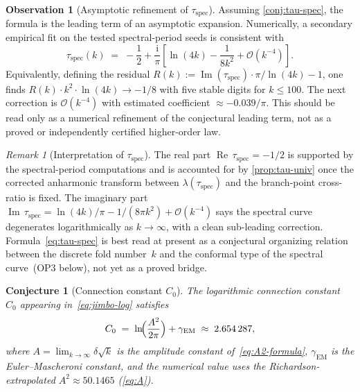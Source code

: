 \documentclass[11pt,a4paper]{article}
\theoremstyle{plain}
\newtheorem{conjecture}[theorem]{Conjecture}
\theoremstyle{definition}
\newtheorem{observation}[theorem]{Observation}
\theoremstyle{remark}
\newtheorem{remark}[theorem]{Remark}
\DeclareMathOperator{\Real}{Re}
\DeclareMathOperator{\Imag}{Im}
\newcommand{\ii}{\mathrm{i}}
\newcommand{\Oo}{\mathcal{O}}
\begin{document}
\begin{observation}[Asymptotic refinement of $\tau_{\mathrm{spec}}$]
\label{cor:tau-refined}
Assuming \cref{conj:tau-spec}, the formula is the leading term of an
asymptotic expansion.  Numerically, a secondary empirical fit on the
tested spectral-period seeds is consistent with
\begin{equation}\label{eq:tau-refined}
  \tau_{\mathrm{spec}}(k)
  \;=\; -\frac{1}{2}
  + \frac{\ii}{\pi}\!\left[
    \ln(4k) - \frac{1}{8k^2} + \Oo(k^{-4})
  \right].
\end{equation}
Equivalently, defining the residual
$R(k) := \Imag(\tau_{\mathrm{spec}})\cdot\pi/\ln(4k) - 1$,
one finds $R(k)\cdot k^2 \cdot \ln(4k) \to -1/8$
with five stable digits for $k \le 100$.
The next correction is $\Oo(k^{-4})$ with estimated
coefficient $\approx -0.039/\pi$.
This should be read only as a numerical refinement of the conjectural
leading term, not as a proved or independently certified higher-order
law.
\end{observation}

\begin{remark}[Interpretation of $\tau_{\mathrm{spec}}$]
\label{rem:tau-spec-meaning}
The real part $\Real\,\tau_{\mathrm{spec}} = -1/2$ is supported by the
spectral-period computations and is accounted for by
\cref{prop:tau-univ} once the corrected anharmonic transform between
$\lambda(\tau_{\mathrm{spec}})$ and the branch-point cross-ratio is fixed.
The imaginary part
$\Imag\,\tau_{\mathrm{spec}} = \ln(4k)/\pi - 1/(8\pi k^2)
+ \Oo(k^{-4})$
says the spectral curve degenerates logarithmically as
$k \to \infty$, with a clean sub-leading correction.
Formula~\eqref{eq:tau-spec} is best read at present as a conjectural
organizing relation between the discrete fold number~$k$ and the
conformal type of the spectral curve~(OP3 below), not yet as a proved
bridge.
\end{remark}

\begin{conjecture}[Connection constant $C_0$]
\label{conj:C0}
The logarithmic connection constant~$C_0$ appearing
in~\eqref{eq:jimbo-log} satisfies
\begin{equation}\label{eq:C0-conj}
  C_0 \;=\; \ln\!\Bigl(\frac{A^2}{2\pi}\Bigr) + \gamma_{\mathrm{EM}}
  \;\approx\; 2.654\,287,
\end{equation}
where $A = \lim_{k\to\infty}\delta\sqrt{k}$ is the amplitude
constant of~\cref{eq:A2-formula},
$\gamma_{\mathrm{EM}}$ is the Euler--Mascheroni constant,
and the numerical value uses the Richardson-extrapolated
$A^2 \approx 50.1465$ (\cref{eq:A}).
\end{conjecture}
\end{document}
